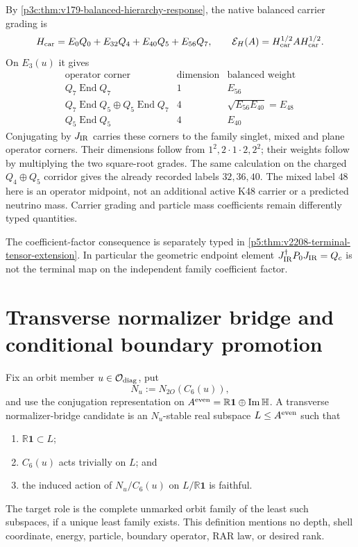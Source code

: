 \documentclass[12pt,a4paper]{article}
\begin{document}
By \ref{p3c:thm:v179-balanced-hierarchy-response}, the native balanced carrier grading is
\[
 H_{\rm car}=E_0Q_0+E_{32}Q_4+E_{40}Q_5+E_{56}Q_7,
 \qquad\mathcal E_H(A)=H_{\rm car}^{1/2}AH_{\rm car}^{1/2}.
\]
On $E_3(u)$ it gives
\[
 \begin{array}{c|c|c}
 \text{operator corner}&\text{dimension}&\text{balanced weight}\\ \hline
 Q_7\operatorname{End}Q_7&1&E_{56}\\
 Q_7\operatorname{End}Q_5\oplus Q_5\operatorname{End}Q_7
       &4&\sqrt{E_{56}E_{40}}=E_{48}\\
 Q_5\operatorname{End}Q_5&4&E_{40}
 \end{array}
\]
Conjugating by $J_{\rm IR}$ carries these corners to the family
singlet, mixed and plane operator corners. Their dimensions follow from
$1^2,2\cdot1\cdot2,2^2$; their weights follow by multiplying the two
square-root grades. The same calculation on the charged $Q_4\oplus Q_5$
corridor gives the already recorded labels $32,36,40$.
The mixed label $48$ here is an operator midpoint, not an additional active
K48 carrier or a predicted neutrino mass. Carrier grading and particle
mass coefficients remain differently typed quantities.


The coefficient-factor consequence is separately typed in
\ref{p5:thm:v2208-terminal-tensor-extension}. In particular the geometric
endpoint element $J_{\rm IR}^\dagger P_0J_{\rm IR}=Q_c$ is not the
terminal map on the independent family coefficient factor.


\section{Transverse normalizer bridge and conditional boundary promotion}
\label{p3c:sec:v166-transverse-normalizer-bridge}

\begin{definition}
\label{p3c:def:v166-transverse-normalizer-bridge-target}
Fix an orbit member \(u\in\mathcal O_{\rm diag}\), put
\[
 N_u:=N_{2O}(C_6(u)),
\]
and use the conjugation representation on
\(A^{\rm even}=\mathbb R\mathbf1\oplus\operatorname{Im}\mathbb H\).
A transverse normalizer-bridge candidate is an \(N_u\)-stable real subspace
\(L\le A^{\rm even}\) such that
\begin{enumerate}[label=\textup{(\roman*)}]
 \item \(\mathbb R\mathbf1\subset L\);
 \item \(C_6(u)\) acts trivially on \(L\); and
 \item the induced action of \(N_u/C_6(u)\) on
 \(L/\mathbb R\mathbf1\) is faithful.
\end{enumerate}
The target role is the complete unmarked orbit family of the least such
subspaces, if a unique least family exists.  This definition mentions no
depth, shell coordinate, energy, particle, boundary operator, RAR law, or
desired rank.
\end{definition}
\end{document}
